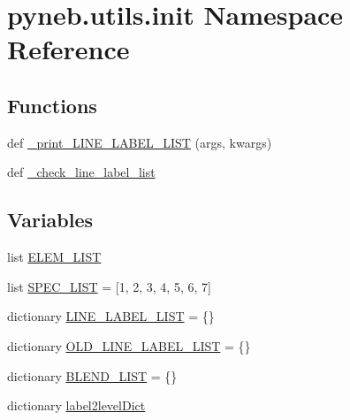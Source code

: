 \hypertarget{namespacepyneb_1_1utils_1_1init}{}\section{pyneb.\+utils.\+init Namespace Reference}
\label{namespacepyneb_1_1utils_1_1init}
\subsection*{Functions}
\begin{DoxyCompactItemize}
\item 
def \hyperlink{namespacepyneb_1_1utils_1_1init_a1d1830a7176a3f6e31326855475849a1}{\+\_\+print\+\_\+\+L\+I\+N\+E\+\_\+\+L\+A\+B\+E\+L\+\_\+\+L\+I\+S\+T} (args, kwargs)
\item 
def \hyperlink{namespacepyneb_1_1utils_1_1init_a1032ff20f913ca4a766e36da2140ee97}{\+\_\+check\+\_\+line\+\_\+label\+\_\+list}
\end{DoxyCompactItemize}
\subsection*{Variables}
\begin{DoxyCompactItemize}
\item 
list \hyperlink{namespacepyneb_1_1utils_1_1init_a3c09818249d1b1194ea51949b934e232}{E\+L\+E\+M\+\_\+\+L\+I\+S\+T}
\item 
list \hyperlink{namespacepyneb_1_1utils_1_1init_afd0ab6834d14e36c7ba2bfa6fdfbd386}{S\+P\+E\+C\+\_\+\+L\+I\+S\+T} = \mbox{[}\textquotesingle{}1\textquotesingle{}, \textquotesingle{}2\textquotesingle{}, \textquotesingle{}3\textquotesingle{}, \textquotesingle{}4\textquotesingle{}, \textquotesingle{}5\textquotesingle{}, \textquotesingle{}6\textquotesingle{}, \textquotesingle{}7\textquotesingle{}\mbox{]}
\item 
dictionary \hyperlink{namespacepyneb_1_1utils_1_1init_a2db1385e0dfb34bdc19ec2e7491041b3}{L\+I\+N\+E\+\_\+\+L\+A\+B\+E\+L\+\_\+\+L\+I\+S\+T} = \{\}
\item 
dictionary \hyperlink{namespacepyneb_1_1utils_1_1init_aae3ff006599d45be21cb0b2753f14802}{O\+L\+D\+\_\+\+L\+I\+N\+E\+\_\+\+L\+A\+B\+E\+L\+\_\+\+L\+I\+S\+T} = \{\}
\item 
dictionary \hyperlink{namespacepyneb_1_1utils_1_1init_a88fe95af75ee9a6faed10cc8a74bac2e}{B\+L\+E\+N\+D\+\_\+\+L\+I\+S\+T} = \{\}
\item 
dictionary \hyperlink{namespacepyneb_1_1utils_1_1init_a7dacd254fb434e414b2792c54049616c}{label2level\+Dict}
\end{DoxyCompactItemize}


